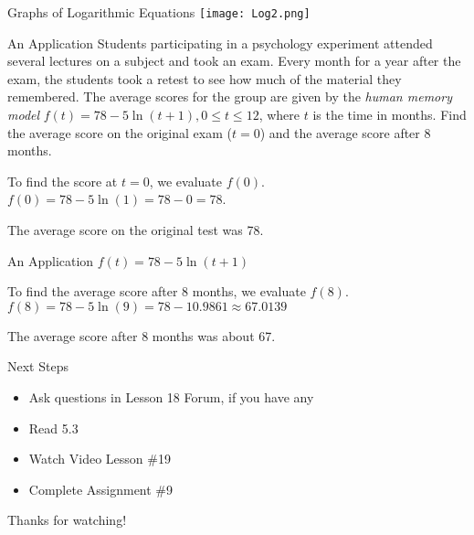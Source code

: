 \documentclass[t, aspectratio=169]{beamer}
\begin{document}
	\begin{frame}{Graphs of Logarithmic Equations}
		\texttt{[image: Log2.png]}
	\end{frame}

	\begin{frame}{An Application}
		Students participating in a psychology experiment attended several lectures on a subject and took an exam. Every month for a year after the exam, the students took a retest to see how much of the material they remembered. The average scores for the group are given by the \textit{human memory model} $f(t) = 78 - 5\ln(t+1), 0\leq t \leq 12$, where $t$ is the time in months. Find the average score on the original exam ($t = 0$) and the average score after 8 months. \pause
		
		To find the score at $t = 0$, we evaluate $f(0)$. \pause \\ $f(0) = 78 - 5\ln(1) = 78 - 0 = 78$. \pause
		
		The average score on the original test was 78.
	\end{frame}

	\begin{frame}{An Application}
		$f(t) = 78 - 5\ln(t + 1)$
		
		To find the average score after 8 months, we evaluate $f(8)$. \pause \\
		$f(8) = 78 - 5\ln(9) = 78 - 10.9861 \approx 67.0139$ \pause
		
		The average score after 8 months was about 67.
	\end{frame}

	\begin{frame}{Next Steps}
		\begin{itemize}
			\item Ask questions in Lesson 18 Forum, if you have any
			\item Read 5.3
			\item Watch Video Lesson \#19
			\item Complete Assignment \#9
		\end{itemize}
	
		\vfill
		
		Thanks for watching!
	\end{frame}
	
\end{document}
